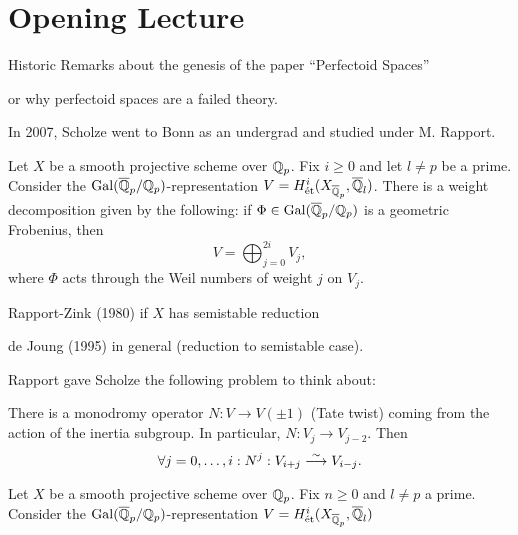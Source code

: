 \section{Opening Lecture}

Historic Remarks about the genesis of the paper ``Perfectoid Spaces''

or why perfectoid spaces are a failed theory.

In 2007, Scholze went to Bonn as an undergrad and studied under M. Rapport. 


Let $X$ be a smooth projective scheme over $\mathbb{Q}_p$. Fix $i \geq 0$ and let $l \neq p$ be a prime. Consider the $\operatorname{Gal}(\overline{\mathbb{Q}}_p/\mathbb{Q}_p)$-representation $V= H_{\text{\'et}}^i(X_{\overline{\mathbb{Q}}_p}, \overline{\mathbb{Q}}_l)$. There is a weight decomposition given by the following: if $\Phi \in \operatorname{Gal}(\overline{\mathbb{Q}}_p/\mathbb{Q}_p)$ is a geometric Frobenius, then 
	\[
	V= \bigoplus_{j=0}^{2i} V_j,
	\]
where $\Phi$ acts through the Weil numbers of weight $j$ on $V_j$. 


Rapport-Zink (1980) if $X$ has semistable reduction 

de Joung (1995) in general (reduction to semistable case).


Rapport gave Scholze the following problem to think about:

There is a monodromy operator $N: V \to V(\pm 1)$ (Tate twist) coming from the action of the inertia subgroup. In particular, $N: V_j \to V_{j-2}$. Then
	\[
	\forall j=0,\ldots,i: N^j: V_{i+j} \stackrel{\sim}{\longrightarrow} V_{i-j}.
	\]









\begin{conj}
Let $X$ be a smooth projective scheme over $\mathbb{Q}_p$. Fix $n \geq 0$ and $l \neq p$ a prime. Consider the $\operatorname{Gal}(\overline{\mathbb{Q}}_p/\mathbb{Q}_p)$-representation $V= H_{\text{\'et}}^i(X_{\overline{\mathbb{Q}}_p}, \overline{\mathbb{Q}}_l)$
\end{conj}



